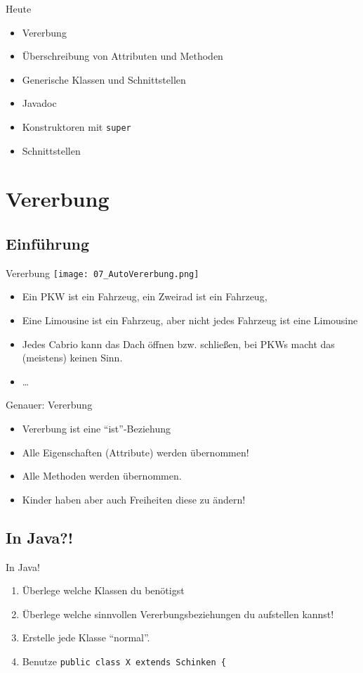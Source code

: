 \documentclass[18pt]{beamer}
\begin{document}
\begin{frame}[fragile]{Heute}
\begin{itemize}
 \item Vererbung
 \item Überschreibung von Attributen und Methoden
 \item Generische Klassen und Schnittstellen
 \item Javadoc
 \item Konstruktoren mit \verb|super|
 \item Schnittstellen 
\end{itemize}
\end{frame}

\section{Vererbung}
\subsection{Einführung}
\begin{frame}{Vererbung}
 \texttt{[image: 07\_AutoVererbung.png]}
 \begin{itemize}
 \item Ein PKW ist ein Fahrzeug, ein Zweirad ist ein Fahrzeug, 
  \item Eine Limousine ist ein Fahrzeug, aber nicht jedes Fahrzeug ist eine Limousine
  \item Jedes Cabrio kann das Dach öffnen bzw. schließen, bei PKWs macht das (meistens) keinen Sinn.
  \item \ldots
 \end{itemize}
\end{frame}

\begin{frame}{Genauer: Vererbung}
 \begin{itemize}
  \item Vererbung ist eine ``ist''-Beziehung
  \item Alle Eigenschaften (Attribute) werden übernommen!
  \item Alle Methoden werden übernommen.
  \item Kinder haben aber auch Freiheiten diese zu ändern!
 \end{itemize}
\end{frame}


\subsection{In Java?!}
\begin{frame}[fragile]{In Java!}
 \begin{enumerate}
  \item Überlege welche Klassen du benötigst
  \item Überlege welche sinnvollen Vererbungsbeziehungen du aufstellen kannst!
  \item Erstelle jede Klasse ``normal''.
  \item Benutze \verb|public class X extends Schinken {|
 \end{enumerate}
\end{frame}
\end{document}
